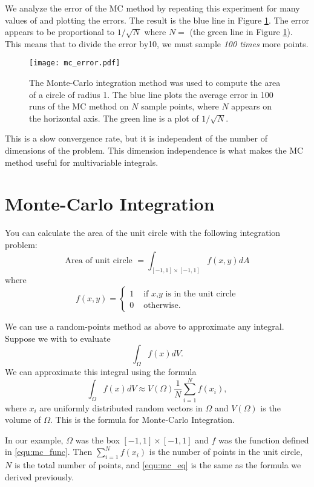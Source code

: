 We analyze the error of the MC method by repeating this experiment for many values of  and plotting the errors.
The result is the blue line in Figure \ref{fig:mc_error}.
The error appears to be proportional to $1/\sqrt{N}$ where $N=$ (the green line in Figure \ref{fig:mc_error}).
This means that to divide the error by10, we must sample \emph{100 times} more points.

\begin{figure}
\texttt{[image: mc\_error.pdf]}
\caption{The Monte-Carlo integration method was used to compute the area of a circle of radius 1. 
The blue line plots the average error in 100 runs of the MC method on $N$ sample points, where $N$ appears on the horizontal axis.
The green line is a plot of $1/\sqrt{N}$. }
\label{fig:mc_error}
\end{figure}

This is a slow convergence rate, but it is independent of the number of dimensions of the problem. 
This dimension independence is what makes the MC method useful for multivariable integrals.

\section*{Monte-Carlo Integration}

You can calculate the area of the unit circle with the following integration problem:
\[
\mbox{Area of unit circle } = \int_{[-1,1]\times[-1,1]} f(x,y) dA
\]
where
\begin{equation}\label{equ:mc_func}
f(x,y) = \begin{cases} 1 &\mbox{ if $x$,$y$ is in the unit circle} \\ 0 &\mbox{ otherwise.} \end{cases}
\end{equation}

We can use a random-points method as above to approximate any integral.
Suppose we with to evaluate
\[
\int_\Omega f(x) dV.
\]
We can approximate this integral using the formula
\begin{equation}\label{equ:mc_eq}
\int_\Omega f(x) dV \approx V(\Omega) \frac{1}{N} \sum_{i=1}^N f(x_i),
\end{equation}
where $x_i$ are uniformly distributed random vectors in $\Omega$ and $V(\Omega)$ is the volume of $\Omega$.
This is the formula for Monte-Carlo Integration. 


In our example, $\Omega$ was the box $[-1,1] \times [-1,1]$ and $f$ was the function defined in \eqref{equ:mc_func}.
Then $\sum_{i=1}^N f(x_i)$ is the number of points in the unit circle, $N$ is the total number of points, and \eqref{equ:mc_eq} is the same as the formula we derived previously.

